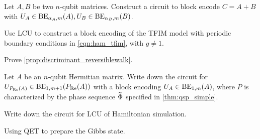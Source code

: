 %
%





\vspace{2em}

\begin{exer}
Let $A,B$ be two $n$-qubit matrices. Construct a circuit to block encode $C=A+B$ with $U_A\in\operatorname{BE}_{\alpha_A,m}(A),U_B\in\operatorname{BE}_{\alpha_B,m}(B)$. 
\end{exer}

\begin{exer}
Use LCU to construct a block encoding of the TFIM model with periodic boundary conditions in \cref{eqn:ham_tfim}, with $g\ne 1$. 
\end{exer}

\begin{exer}
Prove \cref{prop:discriminant_reversiblewalk}.
\end{exer}


\begin{exer}
Let $A$ be an $n$-qubit Hermitian matrix. 
Write down the circuit for $U_{P_{\operatorname{Re}}(A)}\in\operatorname{BE}_{1,m+1}(P_{\operatorname{Re}}(A))$ with a block encoding $U_A\in\operatorname{BE}_{1,m}(A)$, where $P$ is characterized by the phase sequence $\widetilde{\Phi}$ specified in \cref{thm:qsp_simple}.
\end{exer}

\begin{exer}
Write down the circuit for LCU of Hamiltonian simulation.
\end{exer}

\begin{exer}
Using QET to prepare the Gibbs state.
\end{exer}
